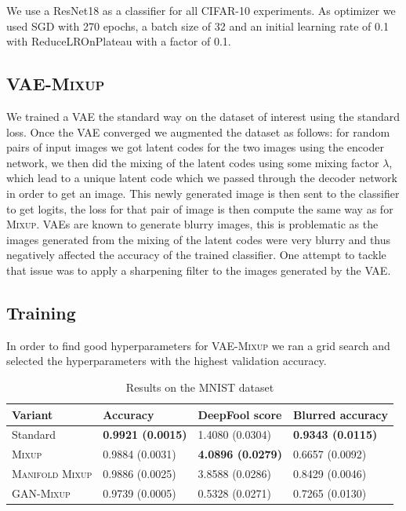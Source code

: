 \documentclass[nohyperref]{article}
\makeatletter
\theoremstyle{plain}
\theoremstyle{definition}
\theoremstyle{remark}
\newcommand\subsubsubsection{\@startsection{paragraph}{4}{\z@}{-2.5ex\@plus -1ex \@minus -.25ex}{1.25ex \@plus .25ex}{\normalfont\normalsize\bfseries}}
\makeatother
\begin{document}
\subsubsubsection{\textsc{Training}}
We use a ResNet18 \cite{resnet} as a classifier for all CIFAR-10 experiments. As optimizer we used SGD with 270 epochs, a batch size of 32 and an initial learning rate of 0.1 with ReduceLROnPlateau with a factor of 0.1.

\subsection{\textsc{VAE-Mixup}}
We trained a VAE the standard way on the dataset of interest using the standard loss. Once the VAE converged we augmented the dataset as follows: for random pairs of input images we got latent codes for the two images using the encoder network, we then did the mixing of the latent codes using some mixing factor $\lambda$, which lead to a unique latent code which we passed through the decoder network in order to get an image. This newly generated image is then sent to the classifier to get logits, the loss for that pair of image is then compute the same way as for \textsc{Mixup}. VAEs are known to generate blurry images, this is problematic as the images generated from the mixing of the latent codes were very blurry and thus negatively affected the accuracy of the trained classifier. One attempt to tackle that issue was to apply a sharpening filter to the images generated by the VAE.

\subsection{Training}
In order to find good hyperparameters for \textsc{VAE-Mixup} we ran a grid search and selected the hyperparameters with the highest validation accuracy.


\begin{table}[htbp]
\small
  \centering
  \begin{tabular}[c]{|l||l|l|l|}
    \hline
    Variant & Accuracy & DeepFool score & Blurred accuracy\\
    \hline
    Standard & \textbf{0.9921 (0.0015)} & 1.4080 (0.0304) & \textbf{0.9343 (0.0115)} \\
    \textsc{Mixup} & 0.9884 (0.0031) & \textbf{4.0896 (0.0279)} & 0.6657 (0.0092) \\
    \textsc{Manifold Mixup} & 0.9886 (0.0025) & 3.8588 (0.0286) & 0.8429 (0.0046) \\
    \textsc{GAN-Mixup} & 0.9739 (0.0005) & 0.5328 (0.0271) & 0.7265 (0.0130) \\
    \hline
  \end{tabular}
  \caption{Results on the MNIST dataset}
  \label{tab:resultsmnist}
\end{table}
\end{document}
